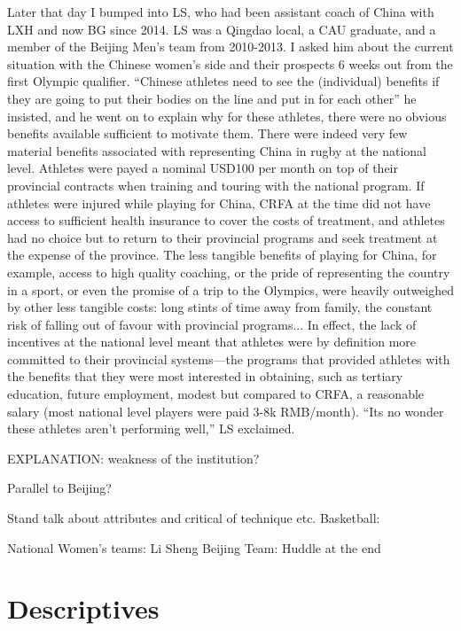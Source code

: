 Later that day I bumped into LS, who had been assistant coach of China with LXH and now BG since 2014.  LS was a Qingdao local, a CAU graduate, and a member of the Beijing Men's team from 2010-2013.  I asked him about the current situation with the Chinese women's side and their prospects 6 weeks out from the first Olympic qualifier.  ``Chinese athletes need to see the (individual) benefits if they are going to put their bodies on the line and put in for each other'' he insisted, and he went on to explain why for these athletes, there were no obvious benefits available sufficient to motivate them.  There were indeed very few material benefits associated with representing China in rugby at the national level.  Athletes were payed a nominal USD100 per month on top of their provincial contracts when training and touring with the national program.  If athletes were injured while playing for China, CRFA at the time did not have access to sufficient health insurance to cover the costs of treatment, and athletes had no choice but to return to their provincial programs and seek treatment at the expense of the province.  The less tangible benefits of playing for China, for example, access to high quality coaching, or the pride of representing the country in a sport, or even the promise of a trip to the Olympics, were heavily outweighed by other less tangible costs: long stints of time away from family, the constant risk of falling out of favour with provincial programs...  In effect, the lack of incentives at the national level meant that athletes were by definition more committed to their provincial systems---the programs that provided athletes with the benefits that they were most interested in obtaining, such as tertiary education, future employment, modest but compared to CRFA, a reasonable salary (most national level players were paid 3-8k RMB/month). ``Its no wonder these athletes aren't performing well,'' LS exclaimed.

EXPLANATION: weakness of the institution?

Parallel to Beijing?


Stand talk about attributes and critical of technique etc.
Basketball:



National Women's teams: Li Sheng
Beijing Team: Huddle at the end










\section{Descriptives}



